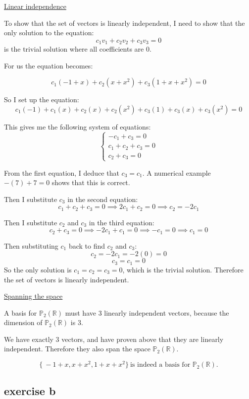 \documentclass[11pt, a4paper]{article}
\begin{document}
\underline{Linear independence}

To show that the set of vectors is linearly independent, I need to show that the only solution to the equation:
\[c_1 v_1 + c_2 v_2 + c_3 v_3 = 0\] 
is the trivial solution where all coefficients are 0.

For us the equation becomes:

\[
c_1 (-1 + x) + c_2 (x + x^2) + c_3 (1 + x + x^2) = 0
\]


So I set up the equation:
\[c_1 (-1) + c_1 (x) + c_2 (x) + c_2 (x^2) + c_3 (1) + c_3 (x) + c_3 (x^2) = 0\]

This gives me the following system of equations:
\[\begin{cases}
	-c_1 + c_3 = 0 \\
	c_1 + c_2 + c_3 = 0 \\
	c_2 + c_3 = 0
\end{cases}\]

From the first equation, I deduce that $c_3 = c_1$. A numerical example $-(7) + 7 = 0$ shows that this is correct.

Then I substitute $c_3$ in the second equation:
\[c_1 + c_2 + c_3 = 0 \implies 2c_1 + c_2 = 0 \implies c_2 = -2c_1\]

Then I substitute $c_2$ and $c_3$ in the third equation:
\[c_2 + c_3 = 0 \implies -2c_1 + c_1 = 0 \implies -c_1 = 0 \implies c_1 = 0\]

Then substituting $c_1$ back to find $c_2$ and $c_3$:
\[c_2 = -2c_1 = -2(0) = 0\]
\[c_3 = c_1 = 0\]
So the only solution is $c_1 = c_2 = c_3 = 0$, which is the trivial solution. Therefore the set of vectors is linearly independent.


\underline{Spanning the space}

A basis for ${\mathbb{P}}_2 ({\mathbb{R}})$ must have 3 linearly independent vectors, because the dimension of ${\mathbb{P}}_2 ({\mathbb{R}})$ is 3.

We have exactly 3 vectors, and have proven above that they are linearly independent. Therefore they also span the space ${\mathbb{P}}_2 ({\mathbb{R}})$.

\[
\boxed{ \{\ -1+x, x+x^2,1+x+x^2 \}\ \text{is indeed a basis for ${\mathbb{P}}_2 ({\mathbb{R}})$.}}
\]



\subsection*{exercise b}
\end{document}
